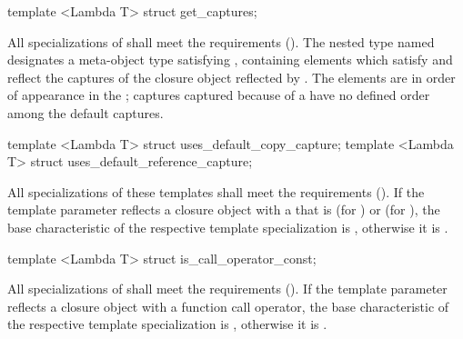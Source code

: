 \begin{std.txt}\color{addclr}
\begin{itemdecl}
template <Lambda T> struct get_captures;
\end{itemdecl}
\begin{itemdescr}
\pnum
      All specializations of  shall meet the
       requirements (). The nested type
      named  designates a meta-object type satisfying , containing elements which satisfy
       and reflect the captures of the closure
      object reflected by .  The elements are in order of appearance
      in the ; captures captured because of a
       have no defined order among the default
      captures.
\end{itemdescr}

\begin{itemdecl}
template <Lambda T> struct uses_default_copy_capture;
template <Lambda T> struct uses_default_reference_capture;
\end{itemdecl}
\begin{itemdescr}
\pnum
      All specializations of these templates shall meet the
       requirements (). If the template
      parameter reflects a closure object with a 
      that is \tcode{=} (for ) or \tcode{\&}
      (for ), the base characteristic of
      the respective template specialization is , otherwise it
      is .
\end{itemdescr}

\begin{itemdecl}
template <Lambda T> struct is_call_operator_const;
\end{itemdecl}
\begin{itemdescr}
\pnum
      All specializations of  shall meet the
       requirements (). If the template
      parameter reflects a closure object with a  function call
      operator, the base characteristic of the respective template
      specialization is , otherwise it is .
\end{itemdescr}
\end{std.txt}



